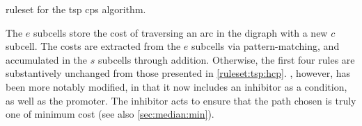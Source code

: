 \begin{cprulesetfloat}
    \begin{cpruleset}
        
        
        
        
        
        
    \end{cpruleset}
    \caption[\Gls{ruleset} for the ]{\label{ruleset:tsp:tsp}\Gls{ruleset} for the \gls{tsp} \gls{cps} algorithm.}
\end{cprulesetfloat}

The \(e\) subcells store the cost of traversing an arc in the digraph with a new \(c\) subcell.  The costs are extracted from the \(e\) subcells via pattern-matching, and accumulated in the \(s\) subcells through addition.  Otherwise, the first four rules are substantively unchanged from those presented in \cref{ruleset:tsp:hcp}.  , however, has been more notably modified, in that it now includes an \gls{inhibitor} as a condition, as well as the \gls{promoter}.  The \gls{inhibitor} acts to ensure that the path chosen is truly one of minimum cost (see also \cref{sec:median:min}).

